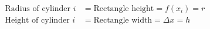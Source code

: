 \documentclass[preview]{standalone}
\begin{document}
\begin{align*}
\text{Radius of cylinder }i&=\text{Rectangle height}=f(x_i)=r \\\text{Height of cylinder }i&=\text{Rectangle width}=\Delta x=h
\end{align*}
\end{document}
